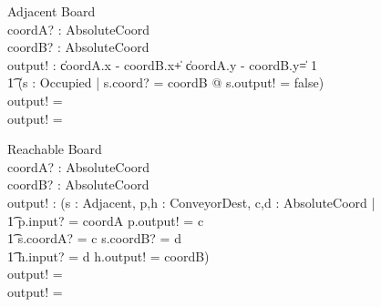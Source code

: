 \documentclass[12pt]{article}
\begin{document}
\begin{schema}{Adjacent}
\Xi Board \\
coordA? : AbsoluteCoord \\
coordB? : AbsoluteCoord \\
output! : \bool
\where
\IF \|coordA.x - coordB.x\| + \|coordA.y - coordB.y\| = 1 \\ \t1
(\exists s : Occupied | s.coord? = coordB @ s.output! = false) \\
\THEN output! = \true \\
\ELSE output! = \false
\end{schema}

\begin{schema}{Reachable}
\Xi Board \\
coordA? : AbsoluteCoord \\
coordB? : AbsoluteCoord \\
output! : \bool
\where
\IF (\exists s : Adjacent, p,h : ConveyorDest, c,d : AbsoluteCoord | \\ \t1
    p.input? = coordA \wedge p.output! = c \\ \t1
    s.coordA? = c \wedge s.coordB? = d \\ \t1
    h.input? = d \wedge h.output! = coordB) \\
\THEN output! = \true \\
\ELSE output! = \false
\end{schema}
\end{document}
